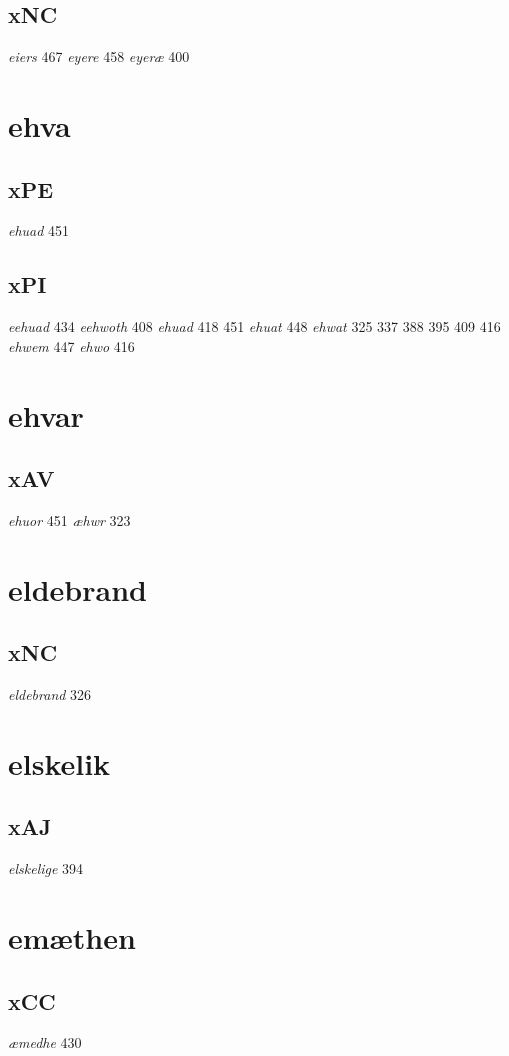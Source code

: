 \documentclass[a4paper,twocolumn]{article}
\begin{document}
\subsection{xNC}
\label{sec:orgcb5a136}
\emph{eiers} 467 \emph{eyere} 458 \emph{eyeræ} 400 
\section{ehva}
\label{sec:orgba0c4b2}
\subsection{xPE}
\label{sec:org62ef5a2}
\emph{ehuad} 451 
\subsection{xPI}
\label{sec:orge543c92}
\emph{eehuad} 434 \emph{eehwoth} 408 \emph{ehuad} 418 451 \emph{ehuat} 448 \emph{ehwat} 325 337 388 395 409 416 \emph{ehwem} 447 \emph{ehwo} 416 
\section{ehvar}
\label{sec:orgad0fead}
\subsection{xAV}
\label{sec:org2b3de4d}
\emph{ehuor} 451 \emph{æhwr} 323 
\section{eldebrand}
\label{sec:orge669918}
\subsection{xNC}
\label{sec:org676b52a}
\emph{eldebrand} 326 
\section{elskelik}
\label{sec:org1121b57}
\subsection{xAJ}
\label{sec:org5ab2dde}
\emph{elskelige} 394 
\section{emæthen}
\label{sec:org234fc3b}
\subsection{xCC}
\label{sec:org44509d8}
\emph{æmedhe} 430 
\end{document}
